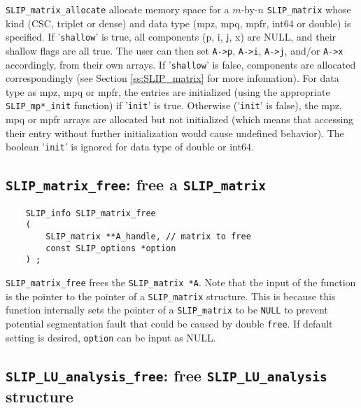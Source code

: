 \documentclass[12pt]{article}
\theoremstyle{definition}
\begin{document}
\verb|SLIP_matrix_allocate| allocate memory space for a $m$-by-$n$
\verb|SLIP_matrix| whose kind (CSC, triplet or dense) and data type (mpz, mpq,
mpfr, int64 or double) is specified. If '\verb|shallow|' is true, all components
(p, i, j, x) are NULL, and their shallow flags are all true. The user can then
set \verb|A->p|, \verb|A->i|, \verb|A->j|, and/or \verb|A->x| accordingly, from
their own arrays. If '\verb|shallow|' is false, components are allocated
correspondingly (see Section \ref{ss:SLIP_matrix} for more infomation). For
data type as mpz, mpq or mpfr, the entries are initialized (using the
appropriate \verb|SLIP_mp*_init| function) if '\verb|init|' is true. Otherwise
('\verb|init|' is false), the mpz, mpq or mpfr arrays are allocated but not
initialized (which means that accessing their entry without further
initialization would cause undefined behavior). The boolean '\verb|init|' is
ignored for data type of double or int64.

\cprotect\subsection{\verb|SLIP_matrix_free|: free a \verb'SLIP_matrix'}
\label{s:user:matrix_free}

\begin{mdframed}[userdefinedwidth=6in]
{\footnotesize
\begin{verbatim}
    SLIP_info SLIP_matrix_free
    (
        SLIP_matrix **A_handle, // matrix to free
        const SLIP_options *option
    ) ;
\end{verbatim}
} \end{mdframed}

\verb|SLIP_matrix_free| frees the \verb|SLIP_matrix *A|.
Note that the input of the function is the pointer to the pointer of a
\verb|SLIP_matrix| structure. This is because this function internally
sets the pointer of a \verb|SLIP_matrix| to be \verb|NULL| to prevent
potential segmentation fault that could be caused by double \verb|free|.
If default setting is desired, \verb|option| can be input as NULL.

\cprotect\subsection{\verb|SLIP_LU_analysis_free|: free \verb|SLIP_LU_analysis| structure}
\label{ss:LU_analysis_free}
\end{document}

